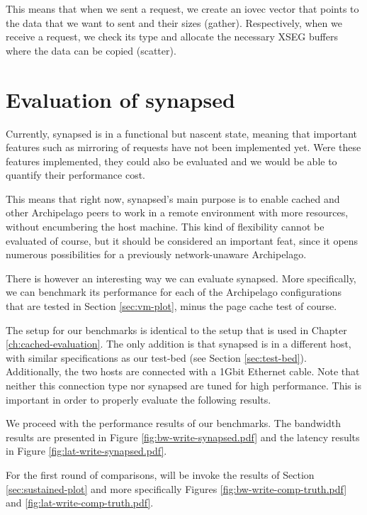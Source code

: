 This means that when we sent a request, we create an iovec vector that points 
to the data that we want to sent and their sizes (gather). Respectively, when 
we receive a request, we check its type and allocate the necessary XSEG buffers 
where the data can be copied (scatter).

\section{Evaluation of synapsed}\label{sec:plot-synapsed}

Currently, synapsed is in a functional but nascent state, meaning that 
important features such as mirroring of requests have not been implemented yet.  
Were these features implemented, they could also be evaluated and we would be 
able to quantify their performance cost.

This means that right now, synapsed's main purpose is to enable cached and 
other Archipelago peers to work in a remote environment with more resources, 
without encumbering the host machine. This kind of flexibility cannot be 
evaluated of course, but it should be considered an important feat, since it 
opens numerous possibilities for a previously network-unaware Archipelago.

There is however an interesting way we can evaluate synapsed. More 
specifically, we can benchmark its performance for each of the Archipelago 
configurations that are tested in Section \ref{sec:vm-plot}, minus the page 
cache test of course. 

The setup for our benchmarks is identical to the setup that is used in Chapter 
\ref{ch:cached-evaluation}. The only addition is that synapsed is in a 
different host, with similar specifications as our test-bed (see Section 
\ref{sec:test-bed}).  Additionally, the two hosts are connected with a 1Gbit 
Ethernet cable. Note that neither this connection type nor synapsed are tuned 
for high performance.  This is important in order to properly evaluate the 
following results.

We proceed with the performance results of our benchmarks. The bandwidth 
results are presented in Figure \ref{fig:bw-write-synapsed.pdf} and the latency 
results in Figure \ref{fig:lat-write-synapsed.pdf}.


For the first round of comparisons, will be invoke the results of Section 
\ref{sec:sustained-plot} and more specifically Figures 
\ref{fig:bw-write-comp-truth.pdf} and \ref{fig:lat-write-comp-truth.pdf}.

